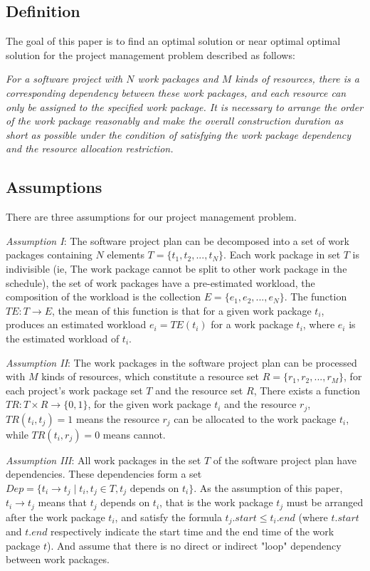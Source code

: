 \subsection{Definition}
%
The goal of this paper is to find an optimal solution or near optimal optimal
solution for the project management problem described as follows:


\emph{
  For a software project with $N$ work packages and $M$ kinds of resources,
  there is a corresponding dependency between these work packages, and each
  resource can only be assigned to the specified work package.  It is necessary
  to arrange the order of the work package reasonably and make the overall
  construction duration as short as possible under the condition of satisfying
  the work package dependency and the resource allocation restriction.
}


\subsection{Assumptions}
%
There are three assumptions for our project management problem.


\emph{Assumption I}: The software project plan can be decomposed into a set of
work packages containing $N$ elements $T = \{t_1, t_2, ..., t_N \}$.
Each work package in set $T$ is indivisible (ie, The work package cannot be
split to other work package in the schedule), the set of work packages have a
pre-estimated workload, the composition of the workload is the collection
$E = \{e _1, e_2, ..., e_N \}$. The function $TE: T \rightarrow E$,
the mean of this function is that for a given work package $t_i$, produces an
estimated workload $e_i = TE(t_i)$ for a work package $t_i$, where $e_i$ is the
estimated workload of $t_i$.


\emph{Assumption II}: The work packages in the software project plan can be
processed with $M$ kinds of resources, which constitute a resource set
$R = \{r_1, r_2, ..., r_M \}$, for each project's work package set $T$ and the
resource set $R$, There exists a function $TR: T \times R \rightarrow \{0, 1\}$,
for the given work package $t_i$ and the resource $r_j$, $TR(t_i, t_j) = 1$
means the resource $r_j$ can be allocated to the work package $t_i$, while
$TR(t_i, r_j) = 0$ means cannot.


\emph{Assumption III}: All work packages in the set $T$ of the software project
plan have dependencies. These dependencies form a set
$Dep= \{t_i \rightarrow t_j \mid t_i, t_j \in T, t_j \text{ depends on } t_i\}$.
As the assumption of this paper, $t_i \rightarrow t_j$ means that $t_j$ depends
on $t_i$, that is the work package $t_j$ must be arranged after the work
package $t_i$, and satisfy the formula $t_j.start \leq t_i.end$ (where $t.start$
and $t.end$ respectively indicate the start time and the end time of the work
package $t$).  And assume that there is no direct or indirect "loop" dependency
between work packages.


